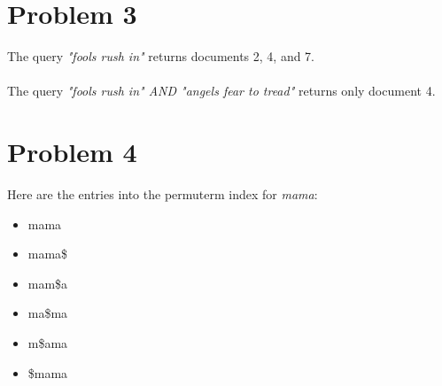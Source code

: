\documentclass{article}%
\begin{document}
\section*{Problem 3}
The query \textit{"fools rush in"} returns documents 2, 4, and 7.\\
\\
The query \textit{"fools rush in" AND "angels fear to tread"} returns only document 4.
\section*{Problem 4}

Here are the entries into the permuterm index for \textit{mama}:
\begin{itemize}
        \item mama
        \item mama\$
        \item mam\$a
        \item ma\$ma
        \item m\$ama
        \item \$mama
\end{itemize}
\end{document}
